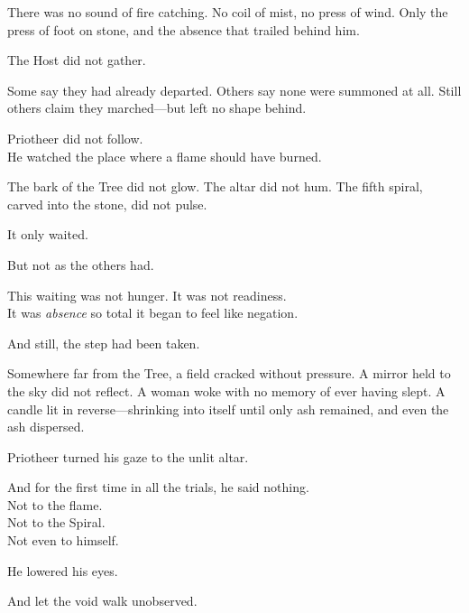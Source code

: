 \documentclass[9pt]{article}
\begin{document}
\vspace{0.5em}
There was no sound of fire catching. No coil of mist, no press of wind. Only the press of foot on stone, and the absence that trailed behind him.

\vspace{0.5em}
The Host did not gather.

\vspace{0.5em}
Some say they had already departed. Others say none were summoned at all. Still others claim they marched---but left no shape behind.

\vspace{0.5em}
Priotheer did not follow.\\
He watched the place where a flame should have burned.

\vspace{0.5em}
The bark of the Tree did not glow. The altar did not hum. The fifth spiral, carved into the stone, did not pulse.

\vspace{0.5em}
It only waited.

\vspace{0.5em}
But not as the others had.

\vspace{0.5em}
This waiting was not hunger. It was not readiness.\\
It was \textit{absence} so total it began to feel like negation.

\vspace{0.5em}
And still, the step had been taken.

\vspace{0.5em}
Somewhere far from the Tree, a field cracked without pressure. A mirror held to the sky did not reflect. A woman woke with no memory of ever having slept. A candle lit in reverse---shrinking into itself until only ash remained, and even the ash dispersed.

\vspace{0.5em}
Priotheer turned his gaze to the unlit altar.

\vspace{0.5em}
And for the first time in all the trials, he said nothing.\\
Not to the flame.\\
Not to the Spiral.\\
Not even to himself.

\vspace{0.5em}
He lowered his eyes.

\vspace{0.5em}
And let the void walk unobserved.
\end{document}
